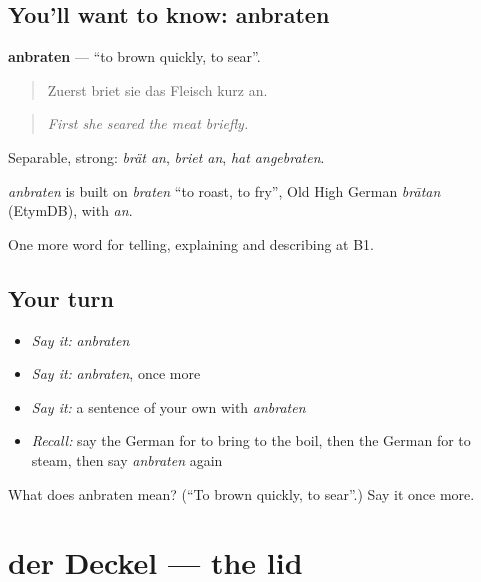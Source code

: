 \subsection*{You'll want to know: anbraten}
\textbf{anbraten} — \textquotedblleft{}to brown quickly, to sear\textquotedblright{}.

\begin{quote}
Zuerst briet sie das Fleisch kurz an.
\end{quote}

\begin{quote}
\emph{First she seared the meat briefly.}
\end{quote}

Separable, strong: \emph{brät an}, \emph{briet an}, \emph{hat angebraten}.

\begin{cousinweb}
\emph{anbraten} is built on \emph{braten} \textquotedblleft{}to roast, to fry\textquotedblright{}, Old High German \emph{brātan} (EtymDB), with \emph{an}.
\end{cousinweb}

\begin{grammarlens}[title={What you've built}]
One more word for telling, explaining and describing at B1.
\end{grammarlens}

\subsection*{Your turn}
\begin{itemize}
\raggedright
  \item \emph{Say it:} \emph{anbraten}
  \item \emph{Say it:} \emph{anbraten}, once more
  \item \emph{Say it:} a sentence of your own with \emph{anbraten}
  \item \emph{Recall:} say the German for to bring to the boil, then the German for to steam, then say \emph{anbraten} again
\end{itemize}

\begin{tcolorbox}[breakable,colback=teal!4,colframe=teal!35!black,title={Before you move on}]
What does anbraten mean? (\textquotedblleft{}To brown quickly, to sear\textquotedblright{}.) Say it once more.
\end{tcolorbox}
\section[der Deckel]{der Deckel — the lid}

